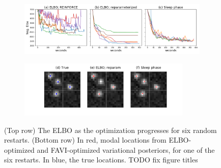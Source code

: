 \begin{figure}[!htb]
    \centering
    \begin{subfigure}[t]{0.9\textwidth}
    \centering
    \includegraphics[width=\textwidth]{figures/elbo_vs_sleep/optim_path_compare.png}
    \end{subfigure}
    \begin{subfigure}[t]{\textwidth}
    \centering
    \includegraphics[width=0.9\textwidth]{figures/elbo_vs_sleep/optim_path_detect_compare.png}
    \end{subfigure}
    \vspace{-1.5cm}
    \caption{(Top row) The ELBO as the optimization progresses for six random restarts.
    (Bottom row) In red, modal locations from ELBO-optimized and FAVI-optimized variational posteriors, for one of the six restarts.
    In blue, the true locations. TODO fix figure titles}
    \label{fig:optim_path}
\end{figure}


